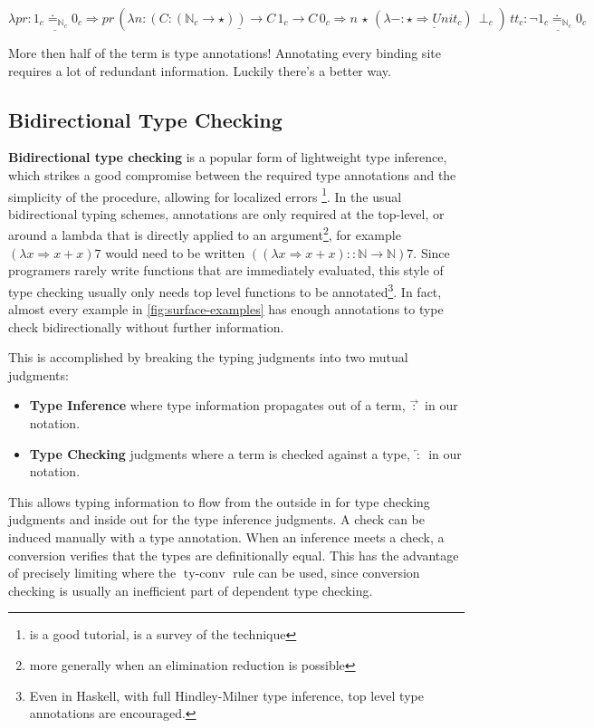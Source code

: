 $\lambda pr\underline{:1_{c}\doteq_{\mathbb{N}_{c}}0_{c}}\Rightarrow pr\,\left(\lambda n:\underline{\left(C:\left(\mathbb{N}_{c}\rightarrow\star\right)\right)\rightarrow C\,1_{c}\rightarrow C\,0_{c}}\Rightarrow n\,\star\,(\lambda-:\underline{\star\Rightarrow Unit_{c}})\,\perp_{c}\right)\,tt_{c}:\underline{\lnot1_{c}\doteq_{\mathbb{N}_{c}}0_{c}}$

More then half of the term is type annotations! Annotating every binding
site requires a lot of redundant information. Luckily there's a better
way.

\subsection{Bidirectional Type Checking}

\textbf{Bidirectional type checking} is a popular form of lightweight
type inference, which strikes a good compromise between the required
type annotations and the simplicity of the procedure, allowing for
localized errors \footnote{\cite{christiansen2013bidirectional} is a good tutorial, \cite{10.1145/3450952}
is a survey of the technique}. In the usual bidirectional typing schemes, annotations are only
required at the top-level, or around a lambda that is directly applied
to an argument\footnote{more generally when an elimination reduction is possible},
for example $(\lambda x\Rightarrow x+x)7$ would need to be written
$\left((\lambda x\Rightarrow x+x)::\mathbb{N}\rightarrow\mathbb{N}\right)7$.
Since programers rarely write functions that are immediately evaluated,
this style of type checking usually only needs top level functions
to be annotated\footnote{Even in Haskell, with full Hindley-Milner type inference, top level
type annotations are encouraged.}.
In fact, almost every example in \ref{fig:surface-examples} has enough
annotations to type check bidirectionally without further information. 

This is accomplished by breaking the typing judgments into two mutual
judgments: 
\begin{itemize}
\item \textbf{Type Inference} where type information propagates out of a
term, $\overrightarrow{\,:\,}$ in our notation. 
\item \textbf{Type Checking} judgments where a term is checked against a
type, $\overleftarrow{\,:\,}$ in our notation. 
\end{itemize}
This allows typing information to flow from the outside in for type
checking judgments and inside out for the type inference judgments.
A check can be induced manually with a type annotation. When an inference
meets a check, a conversion verifies that the types are definitionally
equal. This has the advantage of precisely limiting where the $\operatorname{ty-conv}$
rule can be used, since conversion checking is usually an inefficient
part of dependent type checking.

